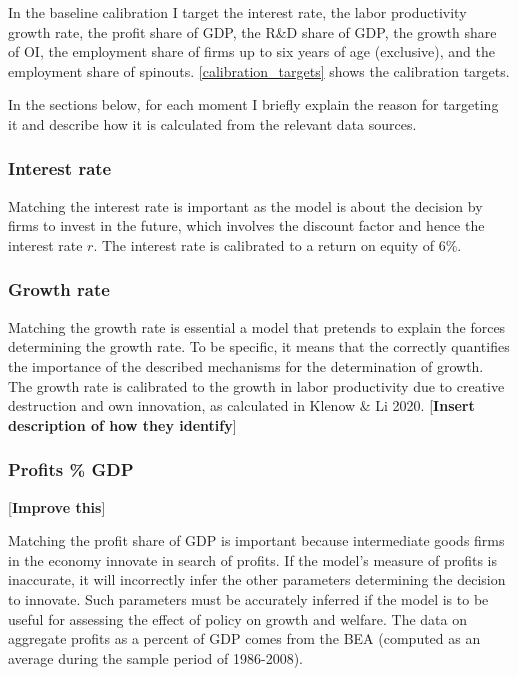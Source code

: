 \documentclass[11pt,english]{article}
\theoremstyle{remark}
\begin{document}
In the baseline calibration I target the interest rate, the labor productivity growth rate, the profit share of GDP, the R\&D share of GDP, the growth share of OI, the employment share of firms up to six years of age (exclusive), and the employment share of spinouts. \autoref{calibration_targets} shows the calibration targets. 

In the sections below, for each moment I briefly explain the reason for targeting it and describe how it is calculated from the relevant data sources.

\subsubsection{Interest rate}

Matching the interest rate is important as the model is about the decision by firms to invest in the future, which involves the discount factor and hence the interest rate $r$. The interest rate is calibrated to a return on equity of 6\%. 

\subsubsection{Growth rate}

Matching the growth rate is essential a model that pretends to explain the forces determining the growth rate. To be specific, it means that the correctly quantifies the importance of the described mechanisms for the determination of growth. The growth rate is calibrated to the growth in labor productivity due to creative destruction and own innovation, as calculated in Klenow \& Li 2020. [\textbf{Insert description of how they identify}]

\subsubsection{Profits \% GDP} 

[\textbf{Improve this}]

Matching the profit share of GDP is important because intermediate goods firms in the economy innovate in search of profits. If the model's measure of profits is inaccurate, it will incorrectly infer the other parameters determining the decision to innovate. Such parameters must be accurately inferred if the model is to be useful for assessing the effect of policy on growth and welfare. The data on aggregate profits as a percent of GDP comes from the BEA (computed as an average during the sample period of 1986-2008). 
\end{document}
